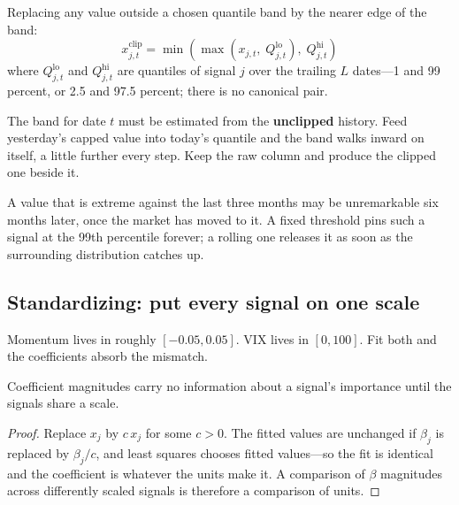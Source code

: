 \begin{definition}[Winsorization]\label{def:winsorize}
Replacing any value outside a chosen quantile band by the nearer edge of the band:
\[
  x^{\text{clip}}_{j,t}
    = \min\left( \max\left( x_{j,t},\; Q^{\text{lo}}_{j,t} \right),\; Q^{\text{hi}}_{j,t} \right)
\]
where $Q^{\text{lo}}_{j,t}$ and $Q^{\text{hi}}_{j,t}$ are quantiles of signal $j$ over the trailing
$L$ dates---1 and 99 percent, or 2.5 and 97.5 percent; there is no canonical pair.
\end{definition}

\begin{note}
The band for date $t$ must be estimated from the \textbf{unclipped} history. Feed yesterday's
capped value into today's quantile and the band walks inward on itself, a little further every
step. Keep the raw column and produce the clipped one beside it.
\end{note}

\begin{note}
A value that is extreme against the last three months may be unremarkable six months later, once
the market has moved to it. A fixed threshold pins such a signal at the 99th percentile forever; a
rolling one releases it as soon as the surrounding distribution catches up.
\end{note}


\subsection{Standardizing: put every signal on one scale}\label{sec:standardizing}

Momentum lives in roughly $[-0.05, 0.05]$. VIX lives in $[0, 100]$. Fit both and the coefficients
absorb the mismatch.

\begin{claim}\label{clm:scale}
Coefficient magnitudes carry no information about a signal's importance until the signals share a
scale.
\end{claim}

\begin{proof}
Replace $x_j$ by $c\, x_j$ for some $c > 0$. The fitted values are unchanged if $\beta_j$ is
replaced by $\beta_j / c$, and least squares chooses fitted values---so the fit is identical and
the coefficient is whatever the units make it. A comparison of $\beta$ magnitudes across
differently scaled signals is therefore a comparison of units.
\end{proof}

